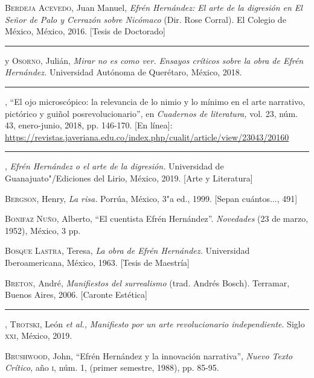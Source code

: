 \documentclass[14pt,twoside,final]{extbook} %
\begin{document}
\textsc{Berdeja Acevedo}, Juan Manuel, \emph{Efrén Hernández: El arte de la digresión en \emph{El Señor de Palo} y \emph{Cerrazón sobre Nicómaco}} (Dir. Rose Corral). El Colegio de México, México, 2016. [Tesis de Doctorado]\label{bib:berdeja2016}

\rule{1cm}{0.4pt} y \textsc{Osorno}, Julián, \emph{Mirar no es como ver. Ensayos críticos sobre la obra de Efrén Hernández.} Universidad Autónoma de Querétaro, México, 2018.\label{bib:berdeja2018a}

\rule{1cm}{0.4pt}, ``El ojo microscópico: la relevancia de lo nimio y lo mínimo en el arte narrativo, pictórico y guiñol posrevolucionario'', en \emph{Cuadernos de literatura,} vol. 23, núm. 43, enero-junio, 2018, pp. 146-170. [En línea]: \url{https://revistas.javeriana.edu.co/index.php/cualit/article/view/23043/20160}\label{bib:berdeja2018b}

\rule{1cm}{0.4pt}, \emph{Efrén Hernández o el arte de la digresión.} Universidad de Guanajuato"/Ediciones del Lirio, México, 2019. [Arte y Literatura]\label{bib:berdeja2019} 

\textsc{Bergson}, Henry, \emph{La risa.} Porrúa, México, 3"a ed., 1999. [Sepan cuántos..., 491]\label{bib:bergson1999}

\textsc{Bonifaz Nuño}, Alberto, ``El cuentista Efrén Hernández''. \emph{Novedades} (23 de marzo, 1952), México, 3 pp.\label{bib:bonifaz1952}

\textsc{Bosque Lastra}, Teresa, \emph{La obra de Efrén Hernández.} Universidad Iberoamericana, México, 1963. [Tesis de Maestría]\label{bib:bosque1963}

\textsc{Breton}, André, \emph{Manifiestos del surrealismo} (trad. Andrés Bosch). Terramar, Buenos Aires, 2006. [Caronte Estética]\label{bib:breton2006}

\rule{1cm}{0.4pt}, \textsc{Trotski}, León \emph{et al.,} \emph{Manifiesto por un arte revolucionario independiente}. Siglo \textsc{xxi}, México, 2019.\label{bib:breton2019}

\textsc{Brushwood}, John, ``Efrén Hernández y la innovación narrativa'', \emph{Nuevo Texto Crítico,} año \textsc{i}, núm. 1, (primer semestre, 1988), pp. 85-95.\label{bib:}
\end{document}
